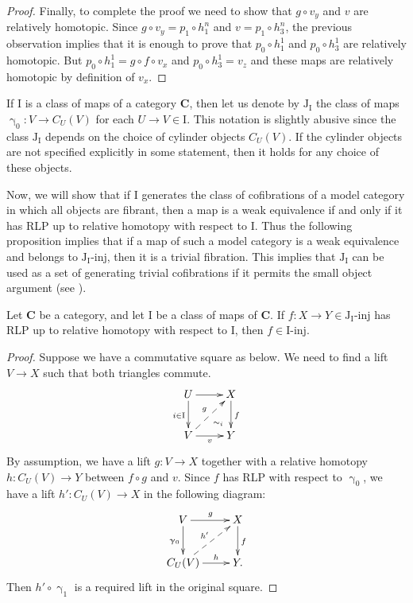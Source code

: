 \documentclass{tac}
\theoremstyle{definition}
\newcommand{\cat}[1]{\mathbf{#1}}
\newcommand{\C}{\cat{C}}
\newcommand{\I}{\mathrm{I}}
\newcommand{\J}{\mathrm{J}}
\newcommand{\class}[2]{#1\text{-}\mathrm{#2}}
\newcommand{\Iinj}[1][\I]{\class{#1}{inj}}
\newcommand{\Jinj}[1][]{\Iinj[\J#1]}
\newcommand{\cyli}{\upgamma}
\begin{document}
\begin{proof}
Finally, to complete the proof we need to show that $g \circ v_y$ and $v$ are relatively homotopic.
Since $g \circ v_y = p_1 \circ h^n_1$ and $v = p_1 \circ h^n_3$, the previous observation implies that it is enough to prove that $p_0 \circ h^1_1$ and $p_0 \circ h^1_3$ are relatively homotopic.
But $p_0 \circ h^1_1 = g \circ f \circ v_x$ and $p_0 \circ h^1_3 = v_z$ and these maps are relatively homotopic by definition of $v_x$.
\end{proof}

If $\I$ is a class of maps of a category $\C$, then let us denote by $\J_\I$ the class of maps $\cyli_0 : V \to C_U(V)$ for each $U \to V \in \I$.
This notation is slightly abusive since the class $\J_\I$ depends on the choice of cylinder objects $C_U(V)$.
If the cylinder objects are not specified explicitly in some statement, then it holds for any choice of these objects.

Now, we will show that if $\I$ generates the class of cofibrations of a model category in which all objects are fibrant,
then a map is a weak equivalence if and only if it has RLP up to relative homotopy with respect to $\I$.
Thus the following proposition implies that if a map of such a model category is a weak equivalence and belongs to $\Jinj[_\I]$, then it is a trivial fibration.
This implies that $\J_\I$ can be used as a set of generating trivial cofibrations if it permits the small object argument (see ).

\begin{prop}
Let $\C$ be a category, and let $\I$ be a class of maps of $\C$.
If $f : X \to Y \in \Jinj[_\I]$ has RLP up to relative homotopy with respect to $\I$, then $f \in \Iinj$.
\end{prop}
\begin{proof}
Suppose we have a commutative square as below.
We need to find a lift $V \to X$ such that both triangles commute.
\[ \xymatrix{ U \ar[d]_{i \in \I} \ar[r] \ar@{}[dr]|(.7){\sim_i} & X \ar[d]^f \\
              V \ar[r]_v \ar@{-->}[ur]^g                         & Y
            } \]
By assumption, we have a lift $g : V \to X$ together with a relative homotopy $h : C_U(V) \to Y$ between $f \circ g$ and $v$.
Since $f$ has RLP with respect to $\cyli_0$, we have a lift $h' : C_U(V) \to X$ in the following diagram:
\[ \xymatrix{ V \ar[r]^g \ar[d]_{\cyli_0}         & X \ar[d]^f \\
              C_U(V) \ar[r]^-h \ar@{-->}[ur]^{h'} & Y.
            } \]
Then $h' \circ \cyli_1$ is a required lift in the original square.
\end{proof}
\end{document}
